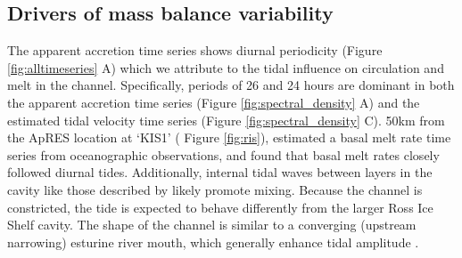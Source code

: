 





\subsection{Drivers of mass balance variability}

The apparent accretion time series shows diurnal periodicity (Figure \ref{fig:alltimeseries} A) which we attribute to the tidal influence on circulation and melt in the channel. 
Specifically, periods of 26 and 24 hours are dominant in both the apparent accretion time series (Figure \ref{fig:spectral_density} A) and the estimated tidal velocity time series (Figure \ref{fig:spectral_density} C).
50km from the ApRES location at `KIS1' ( Figure \ref{fig:ris}), \cite{robinson2020ice} estimated a basal melt rate time series from oceanographic observations, and found that basal melt rates closely followed diurnal tides. 
Additionally, internal tidal waves between layers in the cavity like those described by \cite{robinson2020ice} likely promote mixing.  Because the channel is constricted, the tide is expected to behave differently from the larger Ross Ice Shelf cavity. The shape of the channel is similar to a converging (upstream narrowing) esturine river mouth, which generally enhance tidal amplitude \citep{van2011analytical}.

